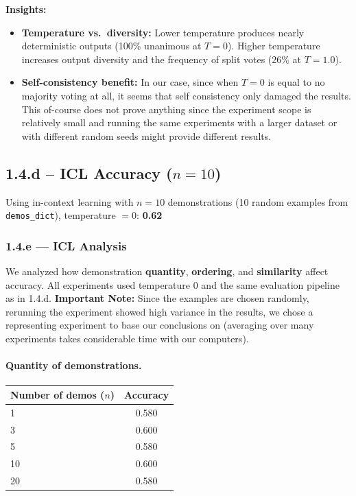 \documentclass[11pt]{article}
\begin{document}
\textbf{Insights:}
\begin{itemize}
    \item \textbf{Temperature vs.\ diversity:} Lower temperature produces nearly deterministic outputs (100\% unanimous at $T=0$). Higher temperature increases output diversity and the frequency of split votes (26\% at $T=1.0$).
    \item \textbf{Self-consistency benefit:} In our case, since when $T=0$ is equal to no majority voting at all, it seems that self consistency only damaged the results. This of-course does not prove anything since the experiment scope is relatively small and running the same experiments with a larger dataset or with different random seeds might provide different results.
\end{itemize}


\newpage
\subsection*{1.4.d -- ICL Accuracy ($n = 10$)}

Using in-context learning with $n = 10$ demonstrations (10 random examples from \texttt{demos\_dict}), temperature $= 0$: \textbf{0.62}

\subsubsection*{1.4.e --- ICL Analysis}

We analyzed how demonstration \textbf{quantity}, \textbf{ordering}, and \textbf{similarity} affect accuracy.
All experiments used temperature $0$ and the same evaluation pipeline as in 1.4.d. \textbf{Important Note:} Since the examples are chosen randomly, rerunning the experiment showed high variance in the results, we chose a representing experiment to base our conclusions on (averaging over many experiments takes considerable time with our computers).

\paragraph{Quantity of demonstrations.}
\begin{center}
\begin{tabular}{lc}
\hline
Number of demos ($n$) & Accuracy \\
\hline
1  & 0.580 \\
3  & 0.600 \\
5  & 0.580 \\
10 & 0.600 \\
20 & 0.580 \\
\hline
\end{tabular}
\end{center}
\end{document}
